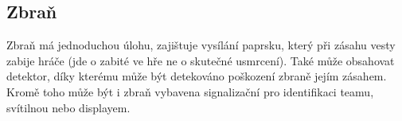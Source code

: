 \subsection{Zbraň}
Zbraň má jednoduchou úlohu, zajištuje vysílání  paprsku, který při zásahu vesty zabije hráče (jde o zabité ve hře ne o skutečné usmrcení). Také může obsahovat  detektor, díky kterému může být detekováno poškození zbraně jejím zásahem. Kromě toho může být i zbraň vybavena signalizační  pro identifikaci teamu, svítilnou nebo displayem.
